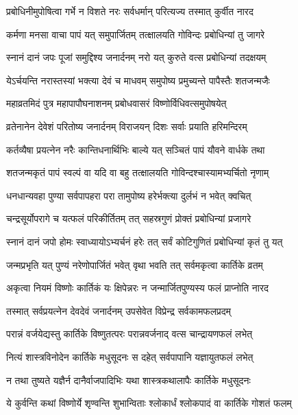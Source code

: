 \twolineshloka
{प्रबोधिनीमुपोषित्वा गर्भे न विशते नरः}%
{सर्वधर्मान् परित्यज्य तस्मात् कुर्वीत नारद}

\twolineshloka
{कर्मणा मनसा वाचा पापं यत् समुपार्जितम्}%
{तत्क्षालयति गोविन्दः प्रबोधिन्यां तु जागरे}

\twolineshloka
{स्नानं दानं जपः पूजां समुद्दिश्य जनार्दनम्}%
{नरो यत् कुरुते वत्स प्रबोधिन्यां तदक्षयम्}

\twolineshloka
{येऽर्चयन्ति नरास्तस्यां भक्त्या देवं च माधवम्}%
{समुपोष्य प्रमुच्यन्ते पापैस्तैः शतजन्मजैः}

\twolineshloka
{महाव्रतमिदं पुत्र महापापौघनाशनम्}%
{प्रबोधवासरं विष्णोर्विधिवत्समुपोषयेत्}

\twolineshloka
{व्रतेनानेन देवेशं परितोष्य जनार्दनम्}%
{विराजयन् दिशः सर्वाः प्रयाति हरिमन्दिरम्}

\twolineshloka
{कर्तव्यैषा प्रयत्नेन नरैः कान्तिधनार्थिभिः}%
{बाल्ये यत् सञ्चितं पापं यौवने वार्धके तथा}

\twolineshloka
{शतजन्मकृतं पापं स्वल्पं वा यदि वा बहु}%
{तत्क्षालयति गोविन्दश्चास्यामभ्यर्चितो नृणाम्}

\twolineshloka
{धनधान्यवहा पुण्या सर्वपापहरा परा}%
{तामुपोष्य हरेर्भक्त्या दुर्लभं न भवेत् क्वचित्}

\twolineshloka
{चन्द्रसूर्योपरागे च यत्फलं परिकीर्तितम्}%
{तत् सहस्रगुणं प्रोक्तं प्रबोधिन्यां प्रजागरे}

\twolineshloka
{स्नानं दानं जपो होमः स्वाध्यायोऽभ्यर्चनं हरेः}%
{तत् सर्वं कोटिगुणितं प्रबोधिन्यां कृतं तु यत्}

\twolineshloka
{जन्मप्रभृति यत् पुण्यं नरेणोपार्जितं भवेत्}%
{वृथा भवति तत् सर्वमकृत्वा कार्तिके व्रतम्}

\twolineshloka
{अकृत्वा नियमं विष्णोः कार्तिकं यः क्षिपेन्नरः}%
{न जन्मार्जितपुण्यस्य फलं प्राप्नोति नारद}

\twolineshloka
{तस्मात् सर्वप्रयत्नेन देवदेवं जनार्दनम्}%
{उपसेवेत विप्रेन्द्र सर्वकामफलप्रदम्}

\twolineshloka
{परान्नं वर्जयेद्यस्तु कार्तिके विष्णुतत्परः}%
{परान्नवर्जनाद् वत्स चान्द्रायणफलं लभेत्}

\twolineshloka
{नित्यं शास्त्रविनोदेन कार्तिके मधुसूदनः}%
{स दहेत् सर्वपापानि यज्ञायुतफलं लभेत्}

\twolineshloka
{न तथा तुष्यते यज्ञैर्न दानैर्वाजपादिभिः}%
{यथा शास्त्रकथालापैः कार्तिके मधुसूदनः}

\twolineshloka
{ये कुर्वन्ति कथां विष्णोर्ये शृण्वन्ति शुभान्विताः}%
{श्लोकार्धं श्लोकपादं वा कार्तिके गोशतं फलम्}

